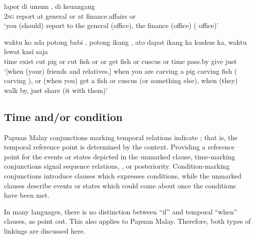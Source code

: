 \ea\label{Example_14.20}
 {lapor} {di} {umum} {,} {di} {keuangang} {}\\ %
 \textsc{2sg}  report  at  general  or  at  finance.affairs  or\\
 ‘you (should) report to the general (office),  the finance (office) ( office)’ \textstyleExampleSource{[081005-001-Cv.0011]}
\z

\ea
\label{Example_14.21}
\gll       {\ldots}  waktu  ko  ada  potong  babi  ,  potong  ikang  ,  ato   dapat  ikang  ka  kuskus  ka,  waktu  lewat  kasi  saja\\  
{} time    exist  cut  pig  or  cut  fish  or  or   get  fish  or  cuscus  or  time  pass.by  give  just\\
\glt ‘[when (your) friends and relatives,] when you are carving a pig  carving fish ( carving ), or (when you) get a fish or cuscus (or something else), when (they) walk by, just share (it with them)’ \textstyleExampleSource{[080919-004-NP.0060]}
\z

\subsection{Time and/or condition}
\label{Para_14.2.3}
Papuan Malay conjunctions marking temporal relations indicate ; that is, the temporal reference point is determined by the context. Providing a reference point for the events or states depicted in the unmarked clause, time-marking conjunctions signal sequence relations, , or posteriority. Con\-dition-mark\-ing conjunctions introduce clauses which expresses conditions, while the unmarked clauses describe events or states which could come about once the conditions have been met.



In many languages, there is no distinction between  ``if'' and temporal ``when'' clauses, as \citet[257]{Thompson.2007} point out. This also applies to Papuan Malay. Therefore, both types of linkings are discussed here.
%


